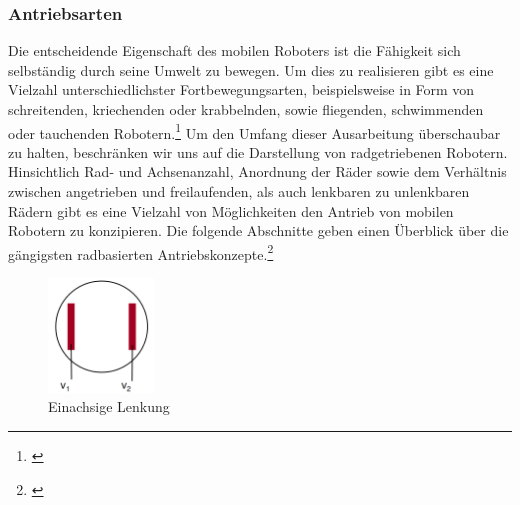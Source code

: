 \subsubsection{Antriebsarten}
Die entscheidende Eigenschaft des mobilen Roboters ist die Fähigkeit sich selbständig durch seine Umwelt zu bewegen. Um dies zu realisieren gibt es eine Vielzahl unterschiedlichster Fortbewegungsarten, beispielsweise in Form von schreitenden, kriechenden oder krabbelnden, sowie fliegenden, schwimmenden oder tauchenden Robotern.\footnote{\citep[vgl.][Mobile Roboter, Seite 103]{Hertzberg.MobileRoboter}\label{note20}}
\newline
Um den Umfang dieser Ausarbeitung überschaubar zu halten, beschränken wir uns auf die Darstellung von radgetriebenen Robotern.
\medskip
\newline
Hinsichtlich Rad- und Achsenanzahl, Anordnung der Räder sowie dem Verhältnis zwischen angetrieben und freilaufenden, als auch lenkbaren zu unlenkbaren Rädern gibt es eine Vielzahl von Möglichkeiten den Antrieb von mobilen Robotern zu konzipieren. Die folgende Abschnitte geben einen Überblick über die gängigsten radbasierten Antriebskonzepte.\footnote{\citep[vgl.][Mobile Roboter, Seite 107 f.]{Hertzberg.MobileRoboter}\label{note21}}
\begin{figure}
	\vspace{+0.5cm}
	\begin{center}
		\includegraphics[width=0.25\textwidth]{images/technische_grundlagen/Differentialantrieb.png}
	\end{center}
	\caption{Einachsige Lenkung}
	\label{fig:einachsenlenkung}
\end{figure}
